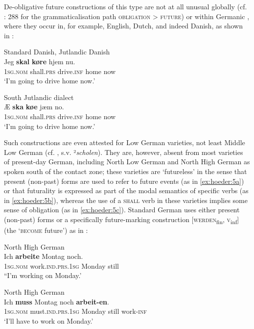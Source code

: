 \documentclass[output=paper]{langsci/langscibook}
\begin{document}
De-obligative future constructions of this type are not at all unusual globally (cf. \citealt{Kuteva.2019}: 288 for the grammaticalisation path{} \textsc{obligation} > \textsc{future}) or within Germanic \citep[319--320]{Dahl.2000}, where they occur in, for example, English, Dutch, and indeed Danish, as shown in :

\ea\label{ex:hoeder:4}
	\ea\label{ex:hoeder:4a}
	Standard Danish, Jutlandic Danish\\
	\gll Jeg \textbf{skal} \textbf{køre}{} hjem nu.\\
     {\textsc{1sg.nom}} shall\textsc{.prs} drive.\textsc{inf} home now\\
	\glt `I’m going to drive home now.'

	\ex\label{ex:hoeder:4b}
		South Jutlandic dialect\\
		\gll Æ \textbf{ska} \textbf{køe}{} jæm no.\\
    	 1\textsc{sg.nom} shall.\textsc{prs} drive.\textsc{inf} home now\\
	\glt `I’m going{} to drive home now.'
\z
\z

Such constructions are even attested for Low German varieties, not least Middle Low German (cf. \citealt{Schiller.18751881}, s.v. ²\textit{scholen}). They are, however, absent from most varieties of present-day German, including North Low German and North High German as spoken south of the contact zone; these varieties are ‘futureless’ in the sense that present (non-past) forms are used to refer to future events (as in \ref{ex:hoeder:5a}) or that futurality is expressed as part of the modal{ semantics of specific verbs (as in \ref{ex:hoeder:5b}), whereas the use of a \textsc{shall}} verb in these varieties implies some sense of obligation (as in \ref{ex:hoeder:5c}). Standard German uses either present (non-past) forms or a specifically future-marking construction {[}\textsc{werden}\textsubscript{fin}, \textsc{v}\textsubscript{inf}{]} (the ‘\textsc{become} future’) as in :

 
\ea\label{ex:hoeder:5}
 	\ea\label{ex:hoeder:5a}
	North High German\\
	\gll Ich \textbf{arbeite} Montag noch.\\
     \textsc{1sg.nom} work.\textsc{ind.prs}.\textsc{1sg} Monday still\\
	\glt “I’m working on Monday.'

 	\ex\label{ex:hoeder:5b}
	North High German\\
	\gll Ich \textbf{muss} Montag noch \textbf{arbeit-en}.\\
     \textsc{1sg.nom} must.\textsc{ind.prs.1sg} Monday still work-\textsc{inf}\\
	\glt `I’ll have to work on Monday.'
\end{document}
